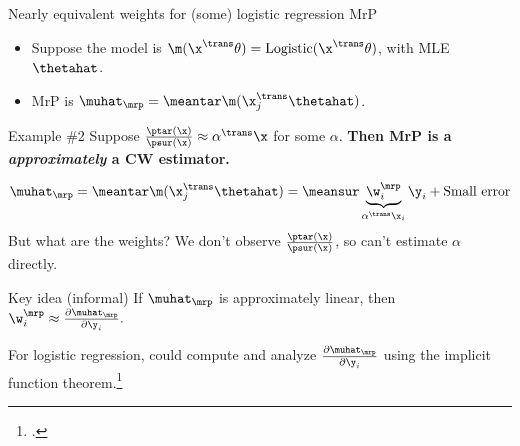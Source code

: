 \begin{frame}[t]{Nearly equivalent weights for (some) logistic regression MrP}

\def\alphav{\mathbf{\alpha}}
%
\begin{itemize}
    \item Suppose the model is $\m(\x^\trans \theta) = \mathrm{Logistic}(\x^\trans \theta)$, with MLE $\thetahat$.
    \item MrP is $\muhat_\mrp = \meantar \m(\x_j^\trans \thetahat)$.
\end{itemize}
%
\begin{block}{Example \#2}
Suppose
    $\frac{\ptar(\x)}{\psur(\x)} \approx \alphav^\trans \x$ for some $\alpha$.
    \textbf{Then MrP is a \emph{approximately} a CW estimator.}
\end{block}

$$
\begin{aligned}
\muhat_\mrp =
    \meantar \m(\x_j^\trans \thetahat) ={}
    \meansur
    \underbrace{\w_i^\mrp}_{\alphav^\trans \x_i} \y_i + \textrm{Small error}
\end{aligned}
$$
But what are the weights?
We don't observe $\frac{\ptar(\x)}{\psur(\x)}$, so can't estimate $\alpha$
directly.\pause

\begin{block}{Key idea (informal)}
\centering
If $\muhat_\mrp$ is approximately linear, then
$\w_i^\mrp \approx \frac{\partial \muhat_\mrp}{\partial \y_i}.$\\
\end{block}\pause

For logistic regression, could compute and analyze $\frac{\partial \muhat_\mrp}{\partial \y_i}$
using the implicit function theorem.\footcite{krantz:2012:implicit,giordano:2019:swiss}

\end{frame}




